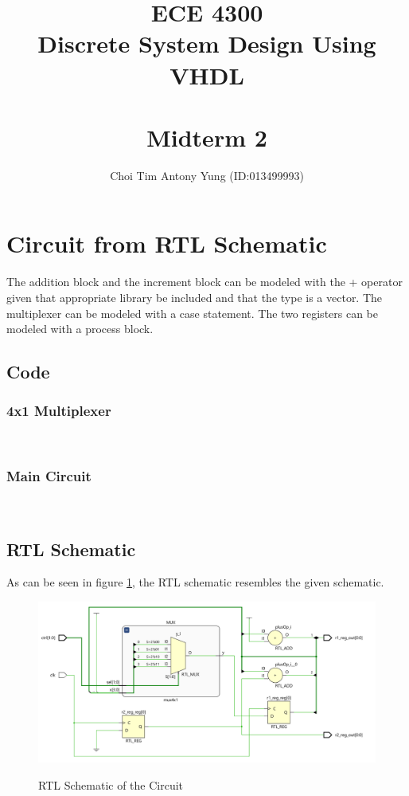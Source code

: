 \documentclass{article}
\title{ECE 4300\\Discrete System Design Using VHDL\\\,\\Midterm 2}
\author{Choi Tim Antony Yung (ID:013499993)}
\begin{document}
 \maketitle

 \newpage


\section{Circuit from RTL Schematic}
The addition block and the increment block can be modeled with the + operator given that appropriate library be included and that the type is a vector. 
The multiplexer can be modeled with a case statement. The two registers can be modeled with a process block.
\subsection*{Code}
\subsubsection*{4x1 Multiplexer}

\;\\
\subsubsection*{Main Circuit}

\;\\
% 
\newpage
\subsection*{RTL Schematic}
As can be seen in figure \ref{fig:1_RTL}, the RTL schematic resembles the given schematic.
\begin{figure}[H]
  \centering
  \caption{RTL Schematic of the Circuit}
  \includegraphics[width=\textwidth]{ECE4304_Midterm2_1_RTL.png}
  \label{fig:1_RTL}
\end{figure}
\end{document}
